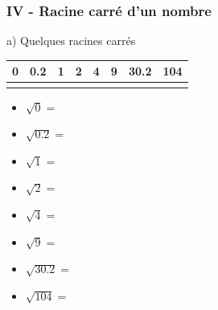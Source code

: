 \documentclass{beamer}
\begin{document}
\begin{frame}
  \frametitle{IV - Racine carré d'un nombre}


  \begin{exampleblock}{}
    a) Quelques racines carrés
  \end{exampleblock}

  \begin{tabular}{| c |   c | c | c | c | c |    c | c |}
    \hline
    0 & 0.2 & 1 & 2 & 4 & 9 & 30.2 & 104 \\
    \hline
    \phantom{azer} & \phantom{azer} & \phantom{azer} & \phantom{azer} & \phantom{azer} & \phantom{azer} & \phantom{azer} & \phantom{azer}\\       
    \hline
  \end{tabular}
  \begin{multicols}{2}
    \begin{itemize}	
    \item $ \sqrt{0} =$
    \item $ \sqrt{0.2} =$
    \item $ \sqrt{1} =$
    \item $ \sqrt{2} =$
    \item $ \sqrt{4} =$
    \item $ \sqrt{9} =$
    \item $ \sqrt{30.2} =$
    \item $ \sqrt{104} =$
    \end{itemize}
  \end{multicols}

\end{frame}
\end{document}
